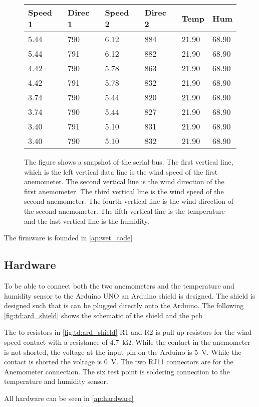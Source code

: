 \begin{figure}[H]
\centering
      \captionsetup{width=0.57\linewidth}
      \footnotesize
\begin{tabular}{llllll}
Speed 1 & Direc 1 & Speed 2 & Direc 2 & Temp  & Hum   \\ \hline
5.44    & 790     & 6.12    & 884     & 21.90 & 68.90 \\
5.44    & 791     & 6.12    & 882     & 21.90 & 68.90 \\
4.42    & 790     & 5.78    & 863     & 21.90 & 68.90 \\
4.42    & 791     & 5.78    & 832     & 21.90 & 68.90 \\
3.74    & 790     & 5.44    & 820     & 21.90 & 68.90 \\
3.74    & 790     & 5.44    & 827     & 21.90 & 68.90 \\
3.40    & 791     & 5.10    & 831     & 21.90 & 68.90 \\
3.40    & 790     & 5.10    & 832     & 21.90 & 68.90
\end{tabular}
\caption{The figure shows a snapshot of the serial bus. The first vertical line, which is the left vertical data line is the wind speed of the first anemometer.  The second vertical line is the wind direction of the first anemometer. The third vertical line is the wind speed of the second anemometer.  The fourth vertical line is the wind direction of the second anemometer. The fifth vertical line is the temperature and the last vertical line is the humidity.}
\label{tp:com_snapshot}
\end{figure}%


The firmware is founded in \autoref{ap:wet_code}


\subsection{Hardware}

To be able to connect both the two anemometers and the temperature and humidity sensor to the Arduino UNO an Arduino shield is designed. The shield is designed such that is can be plugged directly onto the Arduino. The following \autoref{fig:td:ard_shield} shows the schematic of the shield and the \gls{pcb}




The to resistors in \autoref{fig:td:ard_shield} R1 and R2 is pull-up resistors for the wind speed contact with a resistance of \SI{4.7}{\kilo\ohm}. While the contact in the anemometer is not shorted, the voltage at the input pin on the Arduino is \SI{5}{\volt}. While the contact is shorted the voltage is \SI{0}{\volt}. The two RJ11 connectors are for the Anemometer connection. The six test point is soldering connection to the temperature and humidity sensor. 

All hardware can be seen in \autoref{ap:hardware}







